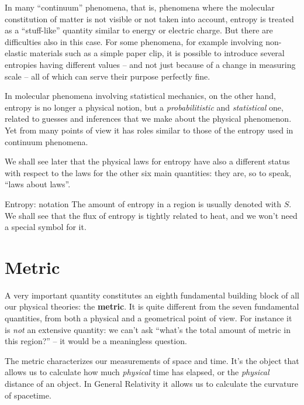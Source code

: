 \documentclass[a4paper,12pt,%
onecolumn,oneside,titlepage,%
british%
]{memoir}
\renewcommand*{\|}[1][]{\nonscript\:#1\vert\nonscript\:\mathopen{}}
\newcommand*{\yS}{S}
\begin{document}
In many \enquote{continuum} phenomena, that is, phenomena where the molecular constitution of matter is not visible or not taken into account, entropy is treated as a \enquote{stuff-like} quantity similar to energy or electric charge. But there are difficulties also in this case. For some phenomena, for example involving non-elastic materials such as a simple paper clip, it is possible to introduce several entropies having different values -- and not just because of a change in measuring scale -- all of which can serve their purpose perfectly fine.

In molecular phenomena involving statistical mechanics, on the other hand, entropy is no longer a physical notion, but a \emph{probabilitistic} and \emph{statistical} one, related to guesses and inferences that we make about the physical phenomenon. Yet from many points of view it has roles similar to those of the entropy used in continuum phenomena.

We shall see later that the physical laws for entropy have also a different status with respect to the laws for the other six main quantities: they are, so to speak, \enquote{laws about laws}.

\smallskip

\begin{definition}{Entropy: notation}
  The amount of entropy in a region is usually denoted with $\yS$. We shall see that the flux of entropy is tightly related to heat, and we won't need a special symbol for it.
\end{definition}


\section{Metric}
\label{sec:metric}

A very important quantity constitutes an eighth fundamental building block of all our physical theories: the \textbf{metric}. It is quite different from the seven fundamental quantities, from both a physical and a geometrical point of view. For instance it is \emph{not} an extensive quantity: we can't ask \enquote{what's the total amount of metric in this region?} -- it would be a meaningless question.

The metric characterizes our measurements of space and time. It's the object that allows us to calculate how much \emph{physical} time has elapsed, or the \emph{physical} distance of an object. In General Relativity it allows us to calculate the curvature of spacetime.
\end{document}
